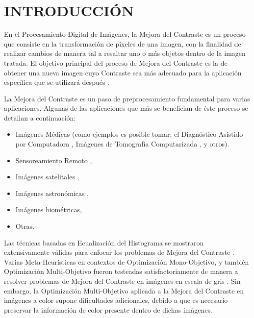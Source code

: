 \chapter{INTRODUCCIÓN}

En el Procesamiento Digital de Imágenes, la Mejora del Contraste es un proceso que consiste en la transformación de pixeles de una imagen, con la finalidad de realizar cambios de manera tal a resaltar uno o más objetos dentro de la imagen tratada. El objetivo principal del proceso de Mejora del Contraste es la de obtener una nueva imagen cuyo Contraste sea más adecuado para la aplicación específica que se utilizará después \cite{gonzalez02a}.

La Mejora del Contraste es un paso de preprocesamiento fundamental para varias aplicaciones. Algunas de las aplicaciones que más se benefician de éste proceso se detallan a continuación:

\begin{itemize}
	\item Imágenes Médicas (como ejemplos es posible tomar: el Diagnóstico Asistido por Computadora \cite{doi2007computer}, Imágenes de Tomografía Computarizada \cite{doi:10.1056/NEJM199303113281008}, y otros).
	\item Sensoreamiento Remoto \cite{lillesand2014remote},

	\item Imágenes satelitales \cite{demirel2010satellite},

	\item Imágenes astronómicas \cite{doi:10.1080/00223638.1981.11738127},

	\item Imágenes biométricas\cite{bennet2011fingerprint},

	\item Otras\cite{BEGHDADI1989162}.
	
\end{itemize}



Las técnicas basadas en Ecualización del Histograma se mostraron extensivamente válidas para enfocar los problemas de Mejora del Contraste \cite{pizer1987adaptive,zuiderveld1994contrast,580378}. %
Varias Meta-Heurísticas en contextos de Optimización Mono-Objetivo, y también Optimización Multi-Objetivo fueron testeadas satisfactoriamente de manera a resolver problemas de Mejora del Contraste en imágenes en escala de gris \cite{morepso,more2015parameter,812529,HOSEINI2013879}. Sin embargo, la Optimización Multi-Objetivo aplicada a la Mejora del Contraste en imágenes a color supone dificultades adicionales, debido a que es necesario preservar la información de color presente dentro de dichas imágenes.

